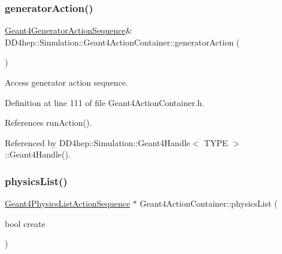 \subsubsection{\texorpdfstring{generator\+Action()}{generatorAction()}\hspace{0.1cm}{\footnotesize\ttfamily [2/2]}}
{\footnotesize\ttfamily \hyperlink{class_d_d4hep_1_1_simulation_1_1_geant4_generator_action_sequence}{Geant4\+Generator\+Action\+Sequence}\& D\+D4hep\+::\+Simulation\+::\+Geant4\+Action\+Container\+::generator\+Action (\begin{DoxyParamCaption}{ }\end{DoxyParamCaption})\hspace{0.3cm}{\ttfamily [inline]}}



Access generator action sequence. 



Definition at line 111 of file Geant4\+Action\+Container.\+h.



References run\+Action().



Referenced by D\+D4hep\+::\+Simulation\+::\+Geant4\+Handle$<$ T\+Y\+P\+E $>$\+::\+Geant4\+Handle().

\hypertarget{class_d_d4hep_1_1_simulation_1_1_geant4_action_container_a78cbddc837b75f151cf76b483b588fb1}{}\label{class_d_d4hep_1_1_simulation_1_1_geant4_action_container_a78cbddc837b75f151cf76b483b588fb1} 
\subsubsection{\texorpdfstring{physics\+List()}{physicsList()}\hspace{0.1cm}{\footnotesize\ttfamily [1/2]}}
{\footnotesize\ttfamily \hyperlink{class_d_d4hep_1_1_simulation_1_1_geant4_physics_list_action_sequence}{Geant4\+Physics\+List\+Action\+Sequence} $\ast$ Geant4\+Action\+Container\+::physics\+List (\begin{DoxyParamCaption}\item[{bool}]{create }\end{DoxyParamCaption})}



